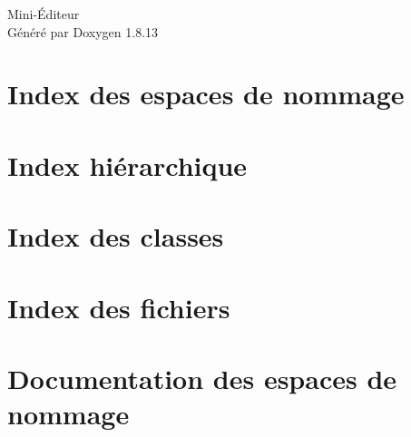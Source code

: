 \documentclass[twoside]{book}
\newcommand{\+}{\discretionary{\mbox{\scriptsize$\hookleftarrow$}}{}{}}
\newcommand{\clearemptydoublepage}{%
  \newpage{\pagestyle{empty}\cleardoublepage}%
}
\begin{document}
\hypersetup{pageanchor=false,
             bookmarksnumbered=true,
             pdfencoding=unicode
            }
\begin{titlepage}
\vspace*{7cm}
\begin{center}%
{\Large Mini-\/Éditeur }\\
\vspace*{1cm}
{\large Généré par Doxygen 1.8.13}\\
\end{center}
\end{titlepage}
\clearemptydoublepage
{}
\tableofcontents
\clearemptydoublepage
{}
\hypersetup{pageanchor=true}

\chapter{Index des espaces de nommage}

\chapter{Index hiérarchique}

\chapter{Index des classes}

\chapter{Index des fichiers}

\chapter{Documentation des espaces de nommage}

\end{document}
